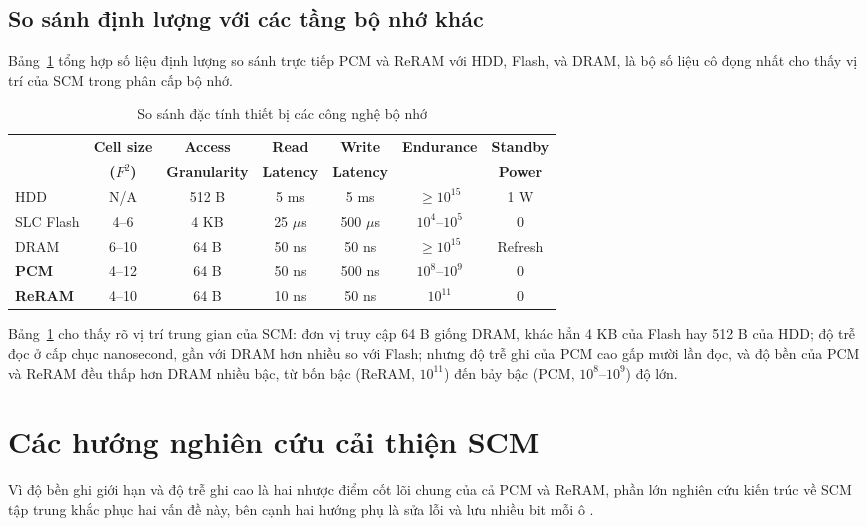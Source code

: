 \documentclass[12pt,a4paper]{article}
\begin{document}
\subsection{So sánh định lượng với các tầng bộ nhớ khác}

Bảng~\ref{tab:scm-comparison} tổng hợp số liệu định lượng so sánh trực tiếp PCM và ReRAM với HDD, Flash, và DRAM, là bộ số liệu cô đọng nhất cho thấy vị trí của SCM trong phân cấp bộ nhớ.

\begin{table}[h]
\centering
\caption{So sánh đặc tính thiết bị các công nghệ bộ nhớ \cite{kamath2019}}
\label{tab:scm-comparison}
\begin{tabular}{lcccccc}
\toprule
& \textbf{Cell size} & \textbf{Access} & \textbf{Read} & \textbf{Write} & \textbf{Endurance} & \textbf{Standby} \\
& \textbf{($F^2$)} & \textbf{Granularity} & \textbf{Latency} & \textbf{Latency} & & \textbf{Power} \\
\midrule
HDD & N/A & 512 B & 5 ms & 5 ms & $\geq 10^{15}$ & 1 W \\
SLC Flash & 4--6 & 4 KB & 25 $\mu$s & 500 $\mu$s & $10^4$--$10^5$ & 0 \\
DRAM & 6--10 & 64 B & 50 ns & 50 ns & $\geq 10^{15}$ & Refresh \\
\textbf{PCM} & 4--12 & 64 B & 50 ns & 500 ns & $10^8$--$10^9$ & 0 \\
\textbf{ReRAM} & 4--10 & 64 B & 10 ns & 50 ns & $10^{11}$ & 0 \\
\bottomrule
\end{tabular}
\end{table}

Bảng~\ref{tab:scm-comparison} cho thấy rõ vị trí trung gian của SCM: đơn vị truy cập 64 B giống DRAM, khác hẳn 4 KB của Flash hay 512 B của HDD; độ trễ đọc ở cấp chục nanosecond, gần với DRAM hơn nhiều so với Flash; nhưng độ trễ ghi của PCM cao gấp mười lần đọc, và độ bền của PCM và ReRAM đều thấp hơn DRAM nhiều bậc, từ bốn bậc (ReRAM, $10^{11}$) đến bảy bậc (PCM, $10^8$--$10^9$) độ lớn.

\section{Các hướng nghiên cứu cải thiện SCM}
\label{sec:scm-research}

Vì độ bền ghi giới hạn và độ trễ ghi cao là hai nhược điểm cốt lõi chung của cả PCM và ReRAM, phần lớn nghiên cứu kiến trúc về SCM tập trung khắc phục hai vấn đề này, bên cạnh hai hướng phụ là sửa lỗi và lưu nhiều bit mỗi ô \cite{kamath2019}.
\end{document}
